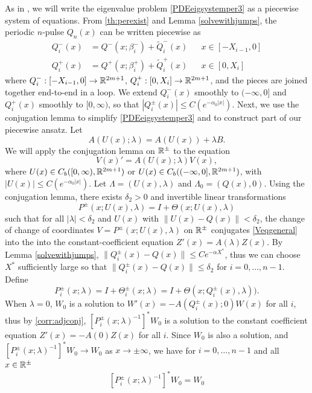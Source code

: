 \documentclass[10pt,reqno]{amsart}
\theoremstyle{plain}
\theoremstyle{definition}
\theoremstyle{remark}
\numberwithin{theorem}{section}
\numberwithin{equation}{section}
\begin{document}
As in \cite{Sandstede1998}, we will write the eigenvalue problem \cref{PDEeigsystemper3} as a piecewise system of equations. From \cref{th:perexist} and Lemma \ref{solvewithjumps}, the periodic $n$-pulse $Q_n(x)$ can be written piecewise as
\begin{equation}\label{Qnppiece}
\begin{aligned}
Q_i^-(x) &= Q^-(x; \beta_i^-) + \tilde{Q}_i^-(x) && x \in [-X_{i-1}, 0] \\
Q_i^+(x) &= Q^+(x; \beta_i^+) + \tilde{Q}_i^+(x) && x \in [0, X_i]
\end{aligned}
\end{equation}
where $Q_i^-: [-X_{i-1}, 0] \rightarrow \mathbb{R}^{2m+1}$, $Q_i^+: [0, X_i] \rightarrow \mathbb{R}^{2m+1}$, and the pieces are joined together end-to-end in a loop. We extend $Q_i^-(x)$ smoothly to $(-\infty, 0]$ and $Q_i^+(x)$ smoothly to $[0, \infty)$, so that $|Q_i^\pm(x)| \leq C (e^{-\alpha_0 |x|})$. Next, we use the conjugation lemma to simplify \cref{PDEeigsystemper3} and to construct part of our piecewise ansatz. Let
\begin{equation}
A(U(x); \lambda) = A(U(x)) + \lambda B.
\end{equation}
We will apply the conjugation lemma on $\mathbb{R}^\pm$ to the equation
\begin{equation}\label{Veqgeneral}
V(x)' = A(U(x); \lambda) V(x),
\end{equation}
where $U(x) \in C_b([0, \infty), \mathbb{R}^{2m+1})$ or $U(x) \in C_b((-\infty, 0], \mathbb{R}^{2m+1})$, with $|U(x)| \leq C (e^{-\alpha_0 |x|})$. Let $\Lambda = (U(x), \lambda)$ and $\Lambda_0 = (Q(x), 0)$. Using the conjugation lemma, there exists $\delta_2 > 0$ and invertible linear transformations
\[
P^\pm(x; U(x), \lambda) = I + \Theta(x; U(x), \lambda)
\]
such that for all $|\lambda| < \delta_2$ and $U(x)$ with $\| U(x) - Q(x) \| < \delta_2$, the change of change of coordinates $V = P^\pm(x; U(x), \lambda)$ on $\mathbb{R}^\pm$ conjugates \cref{Veqgeneral} into the into the constant-coefficient equation $Z'(x) = A(\lambda) Z(x)$. By Lemma \ref{solvewithjumps}, $\| Q_i^\pm(x) - Q(x) \| \leq C e^{-\alpha X^*}$, thus we can choose $X^*$ sufficiently large so that $\| Q_i^\pm(x) - Q(x) \| \leq \delta_2$ for $i = 0, \dots, n-1$. Define
\begin{equation}\label{defPipm}
P_i^\pm(x; \lambda) = I + \Theta_i^\pm(x; \lambda) = I + \Theta(x; Q_i^\pm(x), \lambda)).
\end{equation}
When $\lambda = 0$, $W_0$ is a solution to $W'(x) = -A(Q_i^\pm(x); 0) W(x)$ for all $i$, thus by \cref{corr:adjconj}, $[P_i^\pm(x; \lambda)^{-1}]^* W_0$ is a solution to the constant coefficient equation $Z'(x) = -A(0) Z(x)$ for all $i$. Since $W_0$ is also a solution, and $[P_i^\pm(x; \lambda)^{-1}]^* W_0 \rightarrow W_0$ as $x \rightarrow \pm \infty$, we have for $i = 0, \dots, n-1$ and all $x \in \mathbb{R}^\pm$
\begin{equation}\label{W0conjeq}
[P_i^\pm(x; \lambda)^{-1}]^* W_0 = W_0
\end{equation}
\end{document}
